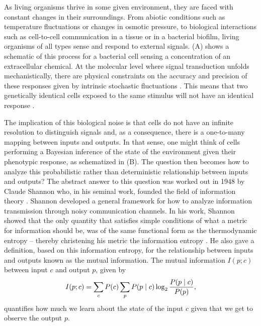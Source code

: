 As living organisms thrive in some given environment, they are faced with
constant changes in their surroundings. From abiotic conditions such as
temperature fluctuations or changes in osmotic pressure, to biological
interactions such as cell-to-cell communication in a tissue or in a bacterial
biofilm, living organisms of all types sense and respond to external signals.
(A) shows a schematic of this process for a bacterial cell
sensing a concentration of an extracellular chemical. At the molecular level
where signal transduction unfolds mechanistically, there are physical
constraints on the accuracy and precision of these responses given by
intrinsic stochastic fluctuations \cite{Nemenman2010}. This means that two
genetically identical cells exposed to the same stimulus will not have an
identical response \cite{Eldar2010}.

The implication of this biological noise is that cells do not have an infinite
resolution to distinguish signals and, as a consequence, there is a one-to-many
mapping between inputs and outputs. In that sense, one might think of cells
performing a Bayesian inference of the state of the environment given their
phenotypic response, as schematized in (B). The question then
becomes how to analyze this probabilistic rather than deterministic relationship
between inputs and outputs? The abstract answer to this question was worked out
in 1948 by Claude Shannon who, in his seminal work, founded the field of
information theory \cite{Shannon1948}. Shannon developed a general framework for
how to analyze information transmission through noisy communication channels. In
his work, Shannon showed that the only quantity that satisfies simple conditions
of what a metric for information should be, was of the same functional form as
the thermodynamic entropy -- thereby christening his metric the information
entropy \cite{MacKay2003}. He also gave a definition, based on this information
entropy, for the relationship between inputs and outputs known as the mutual
information. The mutual information $I(p; c)$ between input $c$ and output $p$,
given by
\begin{equation}
  I(p; c) = \sum_c P(c) \sum_p P(p \mid c) \log_2 {P(p \mid c) \over P(p)},
	\label{eq_mutual_info}
\end{equation}
quantifies how much we learn about the state of the input $c$ given that we get
to observe the output $p$.

